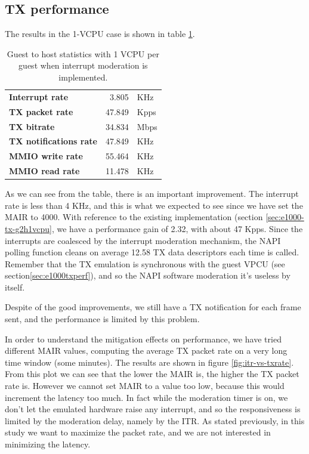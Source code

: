 \subsection{TX performance}
\label{sec:e1000-mit-tx}
The results in the 1-VCPU case is shown in table \ref{tab:e1000-mit-tx-g2h1vcpu}.

\begin{table}
\begin{center}
\begin{tabular}{lrl}
\toprule
\textbf{Interrupt rate} & 3.805 & KHz\\
\textbf{TX packet rate} & 47.849 & Kpps\\
\textbf{TX bitrate} & 34.834 & Mbps\\
\textbf{TX notifications rate} & 47.849 & KHz\\
\textbf{MMIO write rate} & 55.464 & KHz\\
\textbf{MMIO read rate} & 11.478 & KHz\\
\bottomrule
\end{tabular}
\end{center}
\caption{Guest to host statistics with 1 VCPU per guest when interrupt moderation is implemented.}
\label{tab:e1000-mit-tx-g2h1vcpu}
\end{table}

As we can see from the table, there is an important improvement. The interrupt rate is less than 4 KHz, and this is what we expected to see
since we have set the MAIR to 4000.
With reference to the existing implementation (section \ref{sec:e1000-tx-g2h1vcpu}, we have a performance gain of 2.32, with about 47 Kpps.
Since the interrupts are coalesced by the interrupt moderation mechanism, the NAPI polling function cleans on average 12.58 TX data 
descriptors each time is called. Remember that the TX emulation is synchronous with the guest VPCU (see section\ref{sec:e1000txperf}), and
so the NAPI software moderation it's useless by itself.

Despite of the good improvements, we still have a TX notification for each frame sent, and the performance is limited by this
problem.

\vspace{0.5cm}

In order to understand the mitigation effects on performance, we have tried different MAIR values, computing the average TX packet 
rate on a very long time window (some minutes). The results are shown in figure \ref{fig:itr-vs-txrate}.
From this plot we can see that the lower the MAIR is, the higher the TX packet rate is. However we cannot set MAIR to a value too low,
because this would increment the latency too much. In fact while the moderation timer is on, we don't let the emulated hardware raise
any interrupt, and so the responsiveness is limited by the moderation delay, namely by the ITR.
As stated previously, in this study we want to maximize the packet rate, and we are not interested in minimizing the latency.

